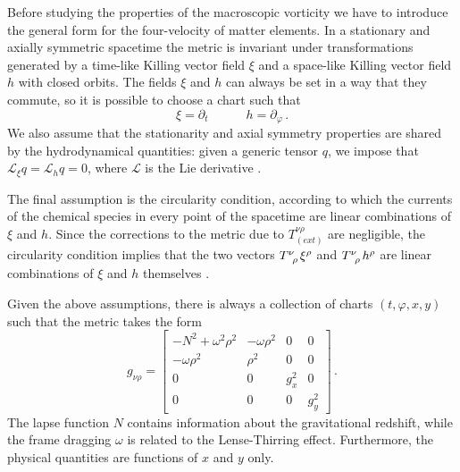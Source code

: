 \documentclass[usenatbib%
]{mnras}
\newcommand{\spc}{\quad \quad \quad}
\begin{document}
Before studying the properties of the macroscopic vorticity we have to introduce the general form for the four-velocity of matter elements. In a stationary and axially symmetric spacetime the metric is invariant under transformations generated by a time-like Killing vector field $\xi$ and a space-like Killing vector field $h$ with closed orbits. 
The fields $\xi$ and   $h$ can always be set in a way that they commute, so it is possible to choose a chart such that \citep{Carter_Commutation}
\begin{equation}
\xi = \partial_t  \spc  h=\partial_\varphi \, .
\end{equation}
We also assume that the stationarity and axial symmetry properties are shared by the hydrodynamical quantities:  given a generic tensor $q$, we impose that $\mathcal{L}_\xi q = \mathcal{L}_h q=0$, where $\mathcal{L}$ is the Lie derivative \citep{gourRS}.

The final assumption is the  circularity condition, according to which  the currents of the chemical species in every point of the spacetime are  linear combinations of $\xi$ and $h$. Since  the corrections to the metric due to   $T_{(ext)}^{\nu \rho}$ are negligible, the  circularity condition implies that the two vectors $T\indices{^\nu _\rho} \xi^\rho$ and  $ T\indices{^\nu _\rho}h^\rho$ are linear combinations of $\xi$ and $h$ themselves \citep{andersson_comer2000}.

Given the above assumptions, there is always a collection of charts $(t,\varphi, x, y)$ such that the metric takes the form  \citep{Hartle_Sharp67}
\begin{equation}\label{astratto}
g_{\nu \rho} =
\begin{bmatrix}
   -N^2 + \omega^2 \rho^2 & -\omega \rho^2 & 0 & 0  \\
    -\omega \rho^2 & \rho^2 & 0 & 0  \\
   0 & 0  & g_x^2 & 0  \\
    0 & 0 & 0 & g_y^2
\end{bmatrix} \, .
\end{equation}
The lapse function $N$  contains information about the gravitational redshift, while the frame dragging $\omega$ is related to the Lense-Thirring effect. 
Furthermore, the physical quantities are functions of $x$ and $y$ only. 
\end{document}
